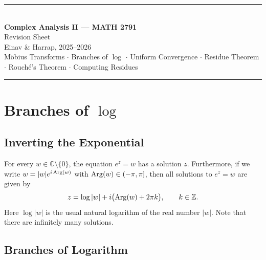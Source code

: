 \documentclass[11pt, a4paper]{article}
\begin{document}
\begin{center}
  {\color{navyblue}\rule{\linewidth}{2pt}}\\[10pt]
  {\LARGE\bfseries\color{navyblue} Complex Analysis II --- MATH 2791}\\[4pt]
  {\large\color{darkgray} Revision Sheet}\\[4pt]
  {\small\color{rulegray} Einav \& Harrap, 2025--2026}\\[6pt]
  {\small\color{darkgray}
    M\"obius Transforms $\cdot$ Branches of $\log$ $\cdot$ Uniform Convergence
    $\cdot$ Residue Theorem $\cdot$ Rouch\'e's Theorem $\cdot$ Computing Residues}\\[10pt]
  {\color{navyblue}\rule{\linewidth}{2pt}}
\end{center}

\tableofcontents
\vspace{10pt}{\color{rulegray}\hrule}\vspace{10pt}


\newpage
\section{Branches of \texorpdfstring{$\log$}{log}}

\subsection*{Inverting the Exponential}

\begin{thmbox}
For every $w\in\mathbb{C}\setminus\{0\}$, the equation $e^z=w$ has a solution $z$. Furthermore, if we write $w=|w|e^{i\operatorname{Arg}(w)}$ with $\operatorname{Arg}(w)\in(-\pi,\pi]$, then all solutions to $e^z=w$ are given by
\[
  z = \log|w| + i\bigl(\operatorname{Arg}(w)+2\pi k\bigr), \qquad k\in\mathbb{Z}.
\]
Here $\log|w|$ is the usual natural logarithm of the real number $|w|$. Note that there are infinitely many solutions.
\end{thmbox}

\subsection*{Branches of Logarithm}
\end{document}
